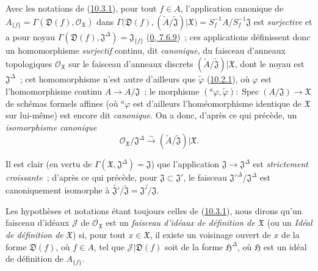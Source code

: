 \begin{env}[10.3.2]
\label{I.10.3.2-fr}
Avec les notations de (\hyperref[I.10.3.1-fr]{10.3.1}), pour tout $f\in A$,
l'application canonique de
$A_{\{f\}}=\Gamma(\mathfrak{D}(f),\mathscr{O}_{\mathfrak{X}})$ dans
$\Gamma\bigl(\mathfrak{D}(f),
(\widetilde{A}/\widetilde{\mathfrak{J}})|\mathfrak{X}\bigr)
=S_f^{-1}A/S_f^{-1}\mathfrak{J}$
est \emph{surjective} et a pour noyau
$\Gamma(\mathfrak{D}(f),\mathfrak{J}^\Delta)=\mathfrak{J}_{\{f\}}$
(\hyperref[0.7.6.9-fr]{0, 7.6.9})~; ces applications définissent donc un
homomorphisme \emph{surjectif} continu, dit \emph{canonique}, du faisceau
d'anneaux topologiques $\mathscr{O}_{\mathfrak{X}}$ sur le faisceau
d'anneaux discrets
$(\widetilde{A}/\widetilde{\mathfrak{J}})|\mathfrak{X}$, dont le noyau est
$\mathfrak{J}^\Delta$~; cet homomorphisme n'est autre d'ailleurs que
$\widetilde{\varphi}$ (\hyperref[I.10.2.1-fr]{10.2.1}), où $\varphi$ est
l'homomorphisme continu $A\to A/\mathfrak{J}$~; le morphisme
$({}^a\varphi,\widetilde{\varphi}):
\operatorname{Spec}(A/\mathfrak{J})\to\mathfrak{X}$ de schémas formels
affines (où ${}^a\varphi$ est d'ailleurs l'homéomorphisme identique de
$\mathfrak{X}$ sur lui-même) est encore dit \emph{canonique}. On a donc,
d'après ce qui précède, un \emph{isomorphisme canonique}
\[
  \mathscr{O}_{\mathfrak{X}}/\mathfrak{J}^\Delta
  \xrightarrow{\sim}
  (\widetilde{A}/\widetilde{\mathfrak{J}})|\mathfrak{X}.
  \tag{10.3.2.1}\label{I.10.3.2.1-fr}
\]

Il est clair (en vertu de
$\Gamma(\mathfrak{X},\mathfrak{J}^\Delta)=\mathfrak{J}$) que
l'application $\mathfrak{J}\to\mathfrak{J}^\Delta$ est
\emph{strictement croissante}~; d'après ce qui précède, pour
$\mathfrak{J}\subset\mathfrak{J}'$, le faisceau
${\mathfrak{J}'}^\Delta/\mathfrak{J}^\Delta$ est canoniquement isomorphe à
$\widetilde{\mathfrak{J}'}/\widetilde{\mathfrak{J}}
=\widetilde{\mathfrak{J}'/\mathfrak{J}}$.
\end{env}

\begin{env}[10.3.3]
\label{I.10.3.3-fr}
Les hypothèses et notations étant toujours celles de
(\hyperref[I.10.3.1-fr]{10.3.1}), nous dirons qu'un faisceau d'idéaux
$\mathscr{J}$ de $\mathscr{O}_{\mathfrak{X}}$ est un
\emph{faisceau d'idéaux de définition de $\mathfrak{X}$} (ou un
\emph{Idéal de définition de $\mathfrak{X}$}) si, pour tout
$x\in\mathfrak{X}$, il existe un voisinage ouvert de $x$ de la forme
$\mathfrak{D}(f)$, où $f\in A$, tel que
$\mathscr{J}|\mathfrak{D}(f)$ soit de la forme $\mathfrak{H}^\Delta$, où
$\mathfrak{H}$ est un idéal de définition de $A_{\{f\}}$.
\end{env}

